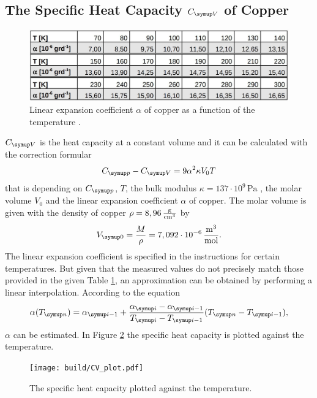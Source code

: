 \subsection{The Specific Heat Capacity $C\idx{V}$ of Copper}
\begin{figure}[h]
    \centering
    \includegraphics[scale=0.4]{alpha_table.pdf}
    \caption{Linear expansion coefficient $\alpha$ of copper as a function of the temperature \cite{V47}.}
    \label{tab:alpha}
\end{figure}
\noindent
$C\idx{V}$ is the heat capacity at a constant volume and it
can be calculated with the correction formular
\begin{equation*}
    C\idx{p}-C\idx{V} = 9 \alpha^2 \kappa V_0 T
\end{equation*}
that is depending on $C\idx{p}$, $T$, the bulk modulus $\kappa= 137 \cdot 10^9\,\unit{\pascal}$ \cite{internetchemie},
the molar volume $V_0$ and the linear expansion coefficient $\alpha$ of copper.
The molar volume is given with the density of copper $\rho= 8,96\,\unit{\frac{\gram}{\centi\meter\cubed}}$\cite{internetchemie} by 
\begin{equation*}
    V\idx{0} = \frac{M}{\rho} = 7,092 \cdot 10^{-6}\,\unit{\frac{\meter\cubed}{\mole}}.
\end{equation*}
The linear expansion coefficient is specified in the instructions for certain temperatures. But given that the measured values do not precisely 
match those provided in the given Table \ref{tab:alpha}, an approximation can be obtained by performing a linear interpolation.
According to the equation
\begin{equation*}
    \alpha(T\idx{n}) = \alpha\idx{i-1} + \frac{\alpha\idx{i}-\alpha\idx{i-1}}{T\idx{i}-T\idx{i-1}} (T\idx{n}-T\idx{i-1}),
\end{equation*}
$\alpha$ can be estimated. In Figure \ref{plot:CV} the specific heat capacity is plotted against the temperature.
\begin{figure}[h]
    \centering
    \texttt{[image: build/CV\_plot.pdf]}
    \caption{The specific heat capacity plotted against the temperature.}
    \label{plot:CV}
\end{figure}

